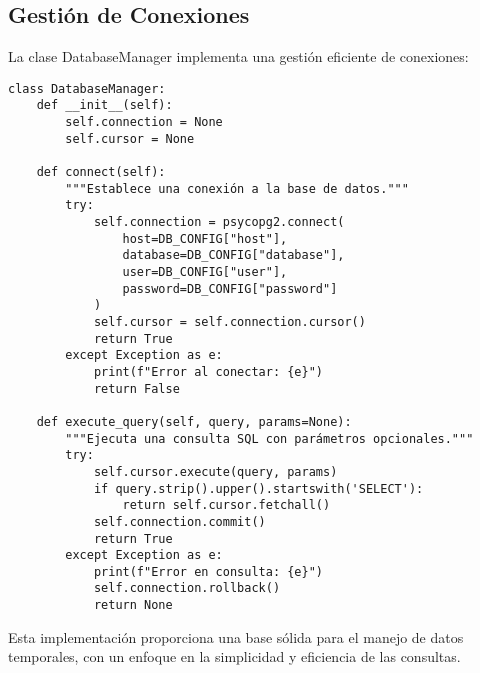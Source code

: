 \subsection{Gestión de Conexiones}
La clase DatabaseManager implementa una gestión eficiente de conexiones:

\begin{lstlisting}[caption={Implementación del DatabaseManager}, label={lst:db_manager}]
class DatabaseManager:
    def __init__(self):
        self.connection = None
        self.cursor = None

    def connect(self):
        """Establece una conexión a la base de datos."""
        try:
            self.connection = psycopg2.connect(
                host=DB_CONFIG["host"],
                database=DB_CONFIG["database"],
                user=DB_CONFIG["user"],
                password=DB_CONFIG["password"]
            )
            self.cursor = self.connection.cursor()
            return True
        except Exception as e:
            print(f"Error al conectar: {e}")
            return False

    def execute_query(self, query, params=None):
        """Ejecuta una consulta SQL con parámetros opcionales."""
        try:
            self.cursor.execute(query, params)
            if query.strip().upper().startswith('SELECT'):
                return self.cursor.fetchall()
            self.connection.commit()
            return True
        except Exception as e:
            print(f"Error en consulta: {e}")
            self.connection.rollback()
            return None
\end{lstlisting}

Esta implementación proporciona una base sólida para el manejo de datos temporales, con un enfoque en la simplicidad y eficiencia de las consultas.
